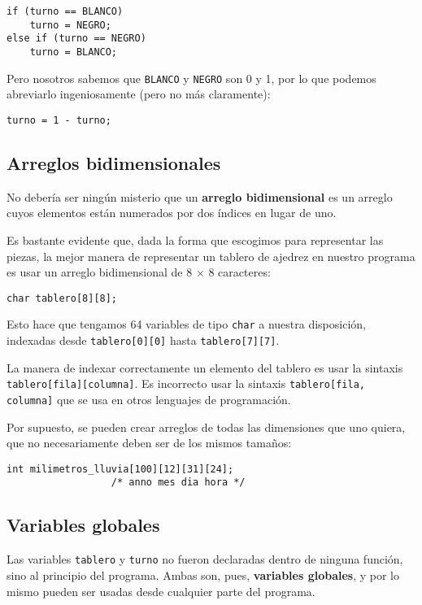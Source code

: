 \begin{lstlisting}
if (turno == BLANCO)
    turno = NEGRO;
else if (turno == NEGRO)
    turno = BLANCO;
\end{lstlisting}

Pero nosotros sabemos que \lstinline!BLANCO! y \lstinline!NEGRO! son 0 y
1, por lo que podemos abreviarlo ingeniosamente (pero no más
claramente):

\begin{lstlisting}
turno = 1 - turno;
\end{lstlisting}

\subsection{Arreglos bidimensionales}

No debería ser ningún misterio que un \textbf{arreglo bidimensional} es
un arreglo cuyos elementos están numerados por dos índices en lugar de
uno.

Es bastante evidente que, dada la forma que escogimos para representar
las piezas, la mejor manera de representar un tablero de ajedrez en
nuestro programa es usar un arreglo bidimensional de 8 × 8 caracteres:

\begin{lstlisting}
char tablero[8][8];
\end{lstlisting}

Esto hace que tengamos 64 variables de tipo \lstinline!char! a nuestra
disposición, indexadas desde \lstinline!tablero[0][0]! hasta
\lstinline!tablero[7][7]!.

La manera de indexar correctamente un elemento del tablero es usar la
sintaxis \lstinline!tablero[fila][columna]!. Es incorrecto usar la
sintaxis \lstinline!tablero[fila, columna]! que se usa en otros
lenguajes de programación.

Por supuesto, se pueden crear arreglos de todas las dimensiones que uno
quiera, que no necesariamente deben ser de los mismos tamaños:

\begin{lstlisting}
int milimetros_lluvia[100][12][31][24];
                  /* anno mes dia hora */
\end{lstlisting}

\subsection{Variables globales}

Las variables \lstinline!tablero! y \lstinline!turno! no fueron
declaradas dentro de ninguna función, sino al principio del programa.
Ambas son, pues, \textbf{variables globales}, y por lo mismo pueden ser
usadas desde cualquier parte del programa.

